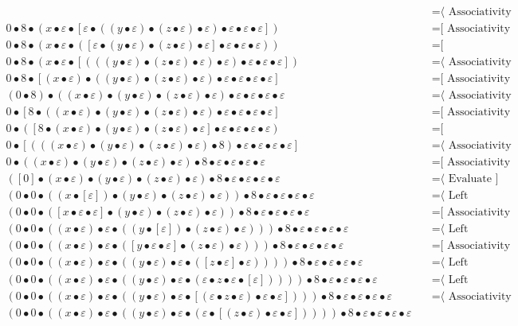 \documentclass{article}
\begin{document}
\begin{align*}
  & \quad \text{=⟨ Associativity ]}\\
0 • 8 • (x • ε • [ε • ((y • ε) • (z • ε) • ε) • ε • ε • ε])
  & \quad \text{=[ Associativity ⟩}\\
0 • 8 • (x • ε • ([ε • (y • ε) • (z • ε) • ε] • ε • ε • ε))
  & \quad \text{=[ Commutativity ⟩}\\
0 • 8 • (x • ε • [(((y • ε) • (z • ε) • ε) • ε) • ε • ε • ε])
  & \quad \text{=⟨ Associativity ]}\\
0 • 8 • [(x • ε) • ((y • ε) • (z • ε) • ε) • ε • ε • ε • ε]
  & \quad \text{=[ Associativity ⟩}\\
(0 • 8) • ((x • ε) • (y • ε) • (z • ε) • ε) • ε • ε • ε • ε
  & \quad \text{=⟨ Associativity ]}\\
0 • [8 • ((x • ε) • (y • ε) • (z • ε) • ε) • ε • ε • ε • ε]
  & \quad \text{=[ Associativity ⟩}\\
0 • ([8 • (x • ε) • (y • ε) • (z • ε) • ε] • ε • ε • ε • ε)
  & \quad \text{=[ Commutativity ⟩}\\
0 • [(((x • ε) • (y • ε) • (z • ε) • ε) • 8) • ε • ε • ε • ε]
  & \quad \text{=⟨ Associativity ]}\\
0 • ((x • ε) • (y • ε) • (z • ε) • ε) • 8 • ε • ε • ε • ε
  & \quad \text{=[ Associativity ⟩}\\
([0] • (x • ε) • (y • ε) • (z • ε) • ε) • 8 • ε • ε • ε • ε
  & \quad \text{=⟨ Evaluate ]}\\
(0 • 0 • ((x • [ε]) • (y • ε) • (z • ε) • ε)) • 8 • ε • ε • ε • ε
  & \quad \text{=⟨ Left neutrality ]}\\
(0 • 0 • ([x • ε • ε] • (y • ε) • (z • ε) • ε)) • 8 • ε • ε • ε • ε
  & \quad \text{=[ Associativity ⟩}\\
(0 • 0 • ((x • ε) • ε • ((y • [ε]) • (z • ε) • ε))) • 8 • ε • ε • ε • ε
  & \quad \text{=⟨ Left neutrality ]}\\
(0 • 0 • ((x • ε) • ε • ([y • ε • ε] • (z • ε) • ε))) • 8 • ε • ε • ε • ε
  & \quad \text{=[ Associativity ⟩}\\
(0 • 0 • ((x • ε) • ε • ((y • ε) • ε • ([z • ε] • ε)))) • 8 • ε • ε • ε • ε
  & \quad \text{=⟨ Left neutrality ]}\\
(0 • 0 • ((x • ε) • ε • ((y • ε) • ε • (ε • z • ε • [ε])))) • 8 • ε • ε • ε • ε
  & \quad \text{=⟨ Left neutrality ]}\\
(0 • 0 • ((x • ε) • ε • ((y • ε) • ε • [(ε • z • ε) • ε • ε]))) • 8 • ε • ε • ε • ε
  & \quad \text{=⟨ Associativity ]}\\
(0 • 0 • ((x • ε) • ε • ((y • ε) • ε • (ε • [(z • ε) • ε • ε])))) • 8 • ε • ε • ε • ε

\end{align*}
\end{document}
